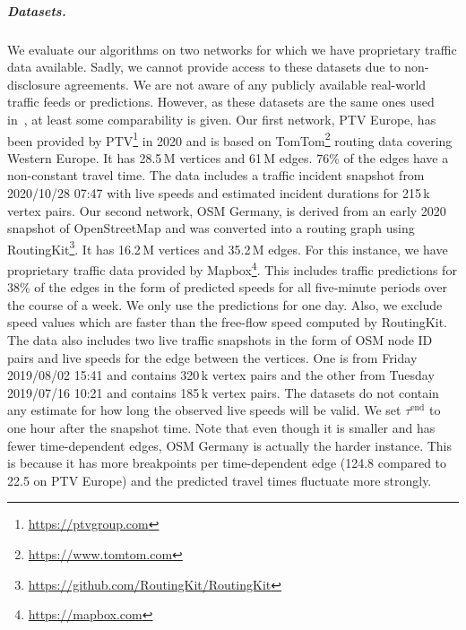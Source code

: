 \documentclass[a4paper,UKenglish,cleveref, autoref, thm-restate,anonymous]{lipics-v2021}
\newcommand*{\tend}{\tau^{\operatorname{end}}}
\begin{document}
\subparagraph{Datasets.}
We evaluate our algorithms on two networks for which we have proprietary traffic data available.
Sadly, we cannot provide access to these datasets due to non-disclosure agreements.
We are not aware of any publicly available real-world traffic feeds or predictions.
However, as these datasets are the same ones used in~\cite{swz-sfert-21,strasser_et_al:LIPIcs.SEA.2021.6}, at least some comparability is given.
%
Our first network, PTV Europe, has been provided by PTV\footnote{\url{https://ptvgroup.com}} in 2020 and is based on TomTom\footnote{\url{https://www.tomtom.com}} routing data covering Western Europe.
It has 28.5\,M vertices and 61\,M edges.
76\% of the edges have a non-constant travel time.
The data includes a traffic incident snapshot from 2020/10/28 07:47 with live speeds and estimated incident durations for 215\,k vertex pairs.
%
Our second network, OSM Germany, is derived from an early 2020 snapshot of OpenStreetMap and was converted into a routing graph using RoutingKit\footnote{\url{https://github.com/RoutingKit/RoutingKit}}.
It has 16.2\,M vertices and 35.2\,M edges.
For this instance, we have proprietary traffic data provided by Mapbox\footnote{\url{https://mapbox.com}}.
This includes traffic predictions for 38\% of the edges in the form of predicted speeds for all five-minute periods over the course of a week.
We only use the predictions for one day.
Also, we exclude speed values which are faster than the free-flow speed computed by RoutingKit.
The data also includes two live traffic snapshots in the form of OSM node ID pairs and live speeds for the edge between the vertices.
One is from Friday 2019/08/02 15:41 and contains 320\,k vertex pairs and the other from Tuesday 2019/07/16 10:21 and contains 185\,k vertex pairs.
The datasets do not contain any estimate for how long the observed live speeds will be valid.
We set $\tend$ to one hour after the snapshot time.
Note that even though it is smaller and has fewer time-dependent edges, OSM Germany is actually the harder instance.
This is because it has more breakpoints per time-dependent edge (124.8 compared to 22.5 on PTV Europe) and the predicted travel times fluctuate more strongly.
\end{document}
